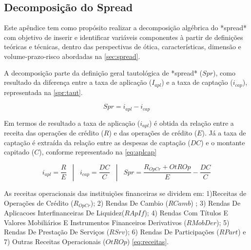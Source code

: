 \documentclass[
  12pt,
  12pt,
  openright,
  oneside,
  a4paper,
  chapter=TITLE,
  section=TITLE,
  subsection=TITLE,
  subsubsection=TITLE,
  english,
  portugues,
  sumario=tradicional]{abntex2}
\begin{document}
\begin{apendicesenv}

\vspace{-10mm}

\renewcommand{\thechapter}{\arabic{chapter}}

\chapter{Decomposição do Spread}\label{apendicea}

Este apêndice tem como propósito realizar a decomposição algébrica do *spread* com objetivo de inserir e identificar variáveis componentes à partir de definições teóricas e técnicas, dentro das perspectivas de ótica, características, dimensão e volume-prazo-risco abordadas na \autoref{sec:spread}.

A decomposição parte da definição geral tautológica de *spread* ($Spr$), como resultado da diferença entre a taxa de aplicação ($I_{apl}$) e a taxa de captação ($i_{cap}$), representada na \autoref{spr:taut}.


\begin{equation}\label{spr:taut}
Spr = i_{apl} - i_{cap} 
\end{equation}


Em termos de resultado a taxa de aplicação ($i_{apl}$) é obtida da relação entre a receita das operações de crédito ($R$) e das operações de crédito ($E$). Já a taxa de captação é extraída da relação entre as despesas de captação ($DC$) e o montante capitado ($C$), conforme representado na \autoref{eq:aplcap}


\begin{equation}\label{eq:aplcap}
i_{apl} = \frac{R}{E}  \hspace{10pt} |  \hspace{10pt} i_{cap} =  \frac{DC}{C}  \hspace{10pt} |  \hspace{10pt} Spr =  \frac{R_{OpCr} + OtROp}{E} -  \frac{DC}{C}
\end{equation}


As receitas operacionais das instituições financeiras se dividem em: 1)Receitas de Operações de Crédito ($R_{OpCr}$); 2) Rendas De Cambio ($RCamb$) ; 3) Rendas De Aplicacoes Interfinanceiras De Liquidez($RApIf$); 4) Rendas Com Títulos E Valores Mobiliários E Instrumentos Financeiros Derivativos ($RMobDer$); 5) Rendas De Prestação De Serviços ($RSrv$); 6) Rendas De Participações ($RPart$) e 7) Outras Receitas Operacionais ($OtROp$) \autoref{eq:receitas}.



\end{apendicesenv}
\end{document}
